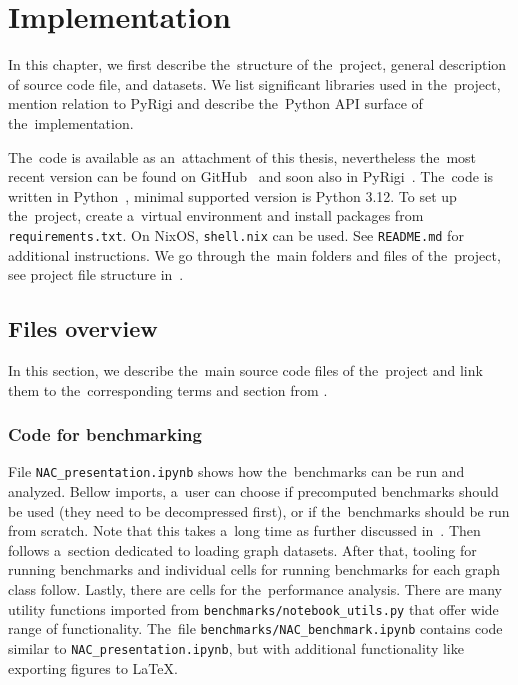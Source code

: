 
\chapter{Implementation}%
\label{chapter:impl}

\begin{chapterabstract}

	In this chapter,
	we first describe the~structure of the~project,
	general description of source code file, and datasets.
	We list significant libraries used in the~project,
	mention relation to PyRigi and
	describe the~Python API surface of the~implementation.

\end{chapterabstract}

The~code is available as an~attachment of this thesis,
nevertheless the~most recent version can be found on GitHub~\cite{my_code}
and soon also in PyRigi~\cite{pyrigi}.
%
The~code is written in Python~\cite{python}, minimal supported version is Python 3.12.
To set up the~project, create a~virtual environment and install packages
from \texttt{requirements.txt}. On NixOS, \texttt{shell.nix} can be used.
See \texttt{README.md} for additional instructions.
We go through the~main folders and files of the~project,
see project file structure in~.


\section{Files overview}

In this section, we describe the~main source code files of the~project
and link them to the~corresponding terms and section
from .

\subsection{Code for benchmarking}

File \texttt{NAC\_presentation.ipynb} shows how the~benchmarks
can be run and analyzed.
Bellow imports, a~user can choose if precomputed benchmarks should be used
(they need to be decompressed first),
or if the~benchmarks should be run from scratch.
Note that this takes a~long time
as further discussed in~.
Then follows a~section dedicated to loading graph datasets.
After that, tooling for running benchmarks and individual cells
for running benchmarks for each graph class follow.
Lastly, there are cells for the~performance analysis.
%
There are many utility functions
imported from \texttt{benchmarks/notebook\_utils.py}
that offer wide range of functionality.
The~file \texttt{benchmarks/NAC\_benchmark.ipynb}
contains code similar to \texttt{NAC\_presentation.ipynb},
but with additional functionality like exporting figures to \LaTeX{}.

